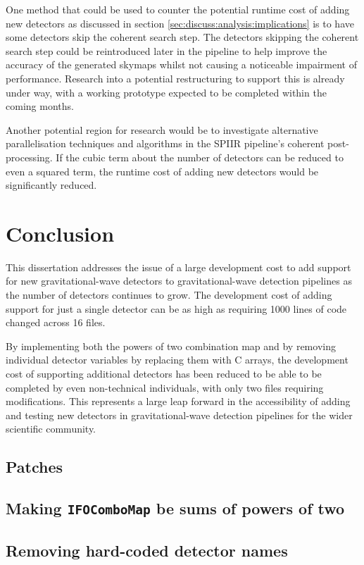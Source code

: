 \documentclass{article}
\begin{document}
One method that could be used to counter the potential runtime cost of adding new detectors \textemdash{} as discussed in section \ref{sec:discuss:analysis:implications} \textemdash{} is to have some detectors skip the coherent search step.
The detectors skipping the coherent search step could be reintroduced later in the pipeline to help improve the accuracy of the generated skymaps whilst not causing a noticeable impairment of performance.
Research into a potential restructuring to support this is already under way, with a working prototype expected to be completed within the coming months.

Another potential region for research would be to investigate alternative parallelisation techniques and algorithms in the SPIIR pipeline's coherent post-processing.
If the cubic term about the number of detectors can be reduced to even a squared term, the runtime cost of adding new detectors would be significantly reduced.

\section{Conclusion} \label{sec:conclusion}

This dissertation addresses the issue of a large development cost to add support for new gravitational-wave detectors to gravitational-wave detection pipelines as the number of detectors continues to grow.
The development cost of adding support for just a single detector can be as high as requiring 1000 lines of code changed across 16 files.

By implementing both the powers of two combination map and by removing individual detector variables by replacing them with C arrays, the development cost of supporting additional detectors has been reduced to be able to be completed by even non-technical individuals, with only two files requiring modifications.
This represents a large leap forward in the accessibility of adding and testing new detectors in gravitational-wave detection pipelines for the wider scientific community.

\printbibliography[heading=bibintoc]{}

\begin{appendices}
    \section{Patches} \label{app:patches}
    \subsection{Making \texttt{IFOComboMap} be sums of powers of two} \label{app:patches:icombo}
    \linespread{0.3}
    \footnotesize{}
    \linespread{1}
    \subsection{Removing hard-coded detector names} \label{app:patches:ndetector}
    \linespread{0.3}
    \footnotesize{}
    \linespread{1}
\end{appendices}
\end{document}

